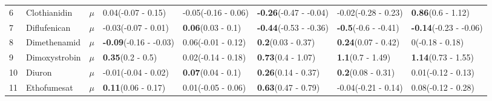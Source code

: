 \begin{longtable}{lp{2cm}p{0.7cm}p{2cm}p{2cm}p{2cm}p{2cm}p{2cm}}
  6 & Clothianidin & $\mu$ & 0.04\newline (-0.07 - 0.15) & -0.05\newline (-0.16 - 0.06) & \textbf{-0.26}\newline (-0.47 - -0.04) & -0.02\newline (-0.28 - 0.23) & \textbf{0.86}\newline (0.6 - 1.12) \\ 
  7 & Diflufenican & $\mu$ & -0.03\newline (-0.07 - 0.01) & \textbf{0.06}\newline (0.03 - 0.1) & \textbf{-0.44}\newline (-0.53 - -0.36) & \textbf{-0.5}\newline (-0.6 - -0.41) & \textbf{-0.14}\newline (-0.23 - -0.06) \\ 
  8 & Dimethenamid & $\mu$ & \textbf{-0.09}\newline (-0.16 - -0.03) & 0.06\newline (-0.01 - 0.12) & \textbf{0.2}\newline (0.03 - 0.37) & \textbf{0.24}\newline (0.07 - 0.42) & 0\newline (-0.18 - 0.18) \\ 
  9 & Dimoxystrobin & $\mu$ & \textbf{0.35}\newline (0.2 - 0.5) & 0.02\newline (-0.14 - 0.18) & \textbf{0.73}\newline (0.4 - 1.07) & \textbf{1.1}\newline (0.7 - 1.49) & \textbf{1.14}\newline (0.73 - 1.55) \\ 
  10 & Diuron & $\mu$ & -0.01\newline (-0.04 - 0.02) & \textbf{0.07}\newline (0.04 - 0.1) & \textbf{0.26}\newline (0.14 - 0.37) & \textbf{0.2}\newline (0.08 - 0.31) & 0.01\newline (-0.12 - 0.13) \\ 
  11 & Ethofumesat & $\mu$ & \textbf{0.11}\newline (0.06 - 0.17) & 0.01\newline (-0.05 - 0.06) & \textbf{0.63}\newline (0.47 - 0.79) & -0.04\newline (-0.21 - 0.14) & 0.08\newline (-0.12 - 0.28) \\ 

\end{longtable}
